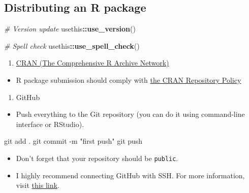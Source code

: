 \documentclass[
]{book}
\newenvironment{Shaded}{\begin{snugshade}}{\end{snugshade}}
\newcommand{\CommentTok}[1]{\textcolor[rgb]{0.56,0.35,0.01}{\textit{#1}}}
\newcommand{\FunctionTok}[1]{\textcolor[rgb]{0.00,0.00,0.00}{#1}}
\newcommand{\KeywordTok}[1]{\textcolor[rgb]{0.13,0.29,0.53}{\textbf{#1}}}
\newcommand{\NormalTok}[1]{#1}
\newcommand{\OperatorTok}[1]{\textcolor[rgb]{0.81,0.36,0.00}{\textbf{#1}}}
\newcommand{\StringTok}[1]{\textcolor[rgb]{0.31,0.60,0.02}{#1}}
\providecommand{\tightlist}{%
  \setlength{\itemsep}{0pt}\setlength{\parskip}{0pt}}
\begin{document}
\hypertarget{distributing-an-r-package}{%
\subsection{Distributing an R package}\label{distributing-an-r-package}}

\begin{Shaded}
\begin{Highlighting}[]
\CommentTok{\# Version update }
\NormalTok{usethis}\OperatorTok{::}\KeywordTok{use\_version}\NormalTok{()}

\CommentTok{\# Spell check}
\NormalTok{usethis}\OperatorTok{::}\KeywordTok{use\_spell\_check}\NormalTok{()}
\end{Highlighting}
\end{Shaded}

\begin{enumerate}
\def\labelenumi{\arabic{enumi}.}
\tightlist
\item
  \href{https://cran.r-project.org/}{CRAN (The Comprehensive R Archive Network)}
\end{enumerate}

\begin{itemize}
\tightlist
\item
  R package submission should comply with \href{https://cran.r-project.org/}{the CRAN Repository Policy}
\end{itemize}

\begin{enumerate}
\def\labelenumi{\arabic{enumi}.}
\setcounter{enumi}{1}
\tightlist
\item
  GitHub
\end{enumerate}

\begin{itemize}
\tightlist
\item
  Push everything to the Git repository (you can do it using command-line interface or RStudio).
\end{itemize}

\begin{Shaded}
\begin{Highlighting}[]
\FunctionTok{git}\NormalTok{ add . }
\FunctionTok{git}\NormalTok{ commit {-}m }\StringTok{"first push"}
\FunctionTok{git}\NormalTok{ push }
\end{Highlighting}
\end{Shaded}

\begin{itemize}
\item
  Don't forget that your repository should be \texttt{public}.
\item
  I highly recommend connecting GitHub with SSH. For more information, visit \href{https://docs.github.com/en/github/authenticating-to-github/connecting-to-github-with-ssh}{this link}.
\end{itemize}
\end{document}

